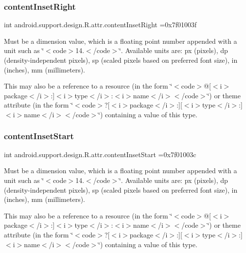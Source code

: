 \subsubsection{\texorpdfstring{content\+Inset\+Right}{contentInsetRight}}
{\footnotesize\ttfamily int android.\+support.\+design.\+R.\+attr.\+content\+Inset\+Right =0x7f01003f\hspace{0.3cm}{\ttfamily [static]}}

Must be a dimension value, which is a floating point number appended with a unit such as \char`\"{}$<$code$>$14.\+5sp$<$/code$>$\char`\"{}. Available units are\+: px (pixels), dp (density-\/independent pixels), sp (scaled pixels based on preferred font size), in (inches), mm (millimeters). 

This may also be a reference to a resource (in the form \char`\"{}$<$code$>$@\mbox{[}$<$i$>$package$<$/i$>$\+:\mbox{]}$<$i$>$type$<$/i$>$\+:$<$i$>$name$<$/i$>$$<$/code$>$\char`\"{}) or theme attribute (in the form \char`\"{}$<$code$>$?\mbox{[}$<$i$>$package$<$/i$>$\+:\mbox{]}\mbox{[}$<$i$>$type$<$/i$>$\+:\mbox{]}$<$i$>$name$<$/i$>$$<$/code$>$\char`\"{}) containing a value of this type. \mbox{\label{classandroid_1_1support_1_1design_1_1R_1_1attr_ad3756cf8d5e48c3ed37e110730040fc9}} 
\subsubsection{\texorpdfstring{content\+Inset\+Start}{contentInsetStart}}
{\footnotesize\ttfamily int android.\+support.\+design.\+R.\+attr.\+content\+Inset\+Start =0x7f01003c\hspace{0.3cm}{\ttfamily [static]}}

Must be a dimension value, which is a floating point number appended with a unit such as \char`\"{}$<$code$>$14.\+5sp$<$/code$>$\char`\"{}. Available units are\+: px (pixels), dp (density-\/independent pixels), sp (scaled pixels based on preferred font size), in (inches), mm (millimeters). 

This may also be a reference to a resource (in the form \char`\"{}$<$code$>$@\mbox{[}$<$i$>$package$<$/i$>$\+:\mbox{]}$<$i$>$type$<$/i$>$\+:$<$i$>$name$<$/i$>$$<$/code$>$\char`\"{}) or theme attribute (in the form \char`\"{}$<$code$>$?\mbox{[}$<$i$>$package$<$/i$>$\+:\mbox{]}\mbox{[}$<$i$>$type$<$/i$>$\+:\mbox{]}$<$i$>$name$<$/i$>$$<$/code$>$\char`\"{}) containing a value of this type. \mbox{\label{classandroid_1_1support_1_1design_1_1R_1_1attr_ade364e02c1282d837b631e217bb67d9d}} 
